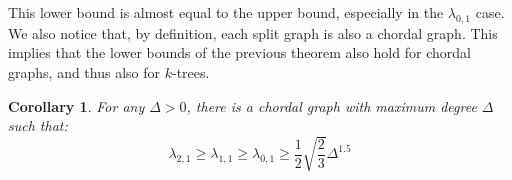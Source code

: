 \documentclass[12pt,a4paper]{article}
\newtheorem{corollary}{Corollary}
\begin{document}
	This lower bound is almost equal to the upper bound, especially in the $\lambda_{0,1}$ case. We also notice that, by definition, each split graph is also a chordal graph. This implies that the lower bounds of the previous theorem also hold for chordal graphs, and thus also for $k$-trees.


	\begin{corollary}
		For any $\Delta > 0$, there is a chordal graph with maximum degree $\Delta$ such that:
		\[\lambda_{2,1} \geq \lambda_{1,1} \geq \lambda_{0,1} \geq \frac{1}{2} \sqrt{\frac{2}{3}} \Delta^{1.5}\]
	\end{corollary}

	\newpage

    \printbibliography
\end{document}
